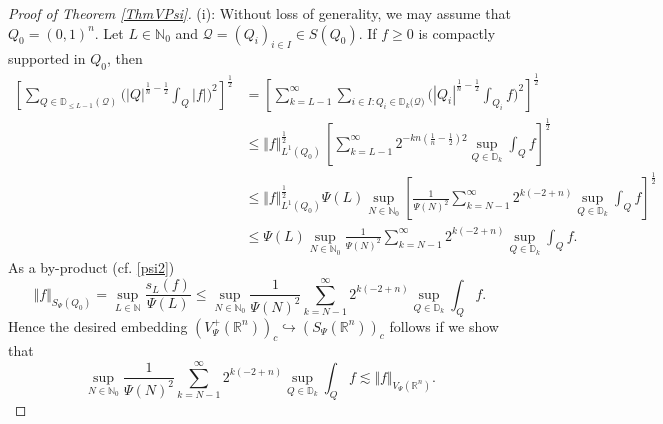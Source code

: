 \documentclass[11pt, a4paper,leqno]{amsart}
\theoremstyle{plain}
\numberwithin{equation}{section}
\theoremstyle{definition}
\theoremstyle{remark}
\def\R{\mathbb{R}}
\begin{document}
\begin{proof}
[Proof of Theorem \ref{ThmVPsi}]


(i): Without loss of generality, we may assume that
$Q_{0}=(0,1)^{n}$. Let $L\in\mathbb{N}_{0}$ and $\mathcal{Q} = (Q_i)_{i \in I}\in S(Q_{0})$. If $f \geq 0$ is compactly supported in $Q_0$, then
\begin{align*}
 \left[\sum_{Q \in \mathbb{D}_{\leq L-1} (\mathcal{Q})}\bigg(|Q|^{\frac{1}%
{n}-\frac{1}{2}}\int_{Q}|f|\bigg)^{2}\right]^{\frac{1}{2}} &  =\left[\sum_{k=L-1}^{\infty}\sum_{i\in I:Q_{i}%
\in\mathbb{D}_{k}(\mathcal{Q)}}\bigg(|Q_{i}|^{\frac{1}{n}-\frac{1}{2}}%
\int_{Q_{i}}f\bigg)^{2}\right]^{\frac{1}{2}}\\
&  \leq\Vert f\Vert_{L^{1}(Q_{0})}^{\frac{1}{2}}\,\left[\sum_{k=L-1}^{\infty
}2^{-kn(\frac{1}{n}-\frac{1}{2})2}\sup_{Q\in\mathbb{D}_{k}}\int_{Q}%
f\right]^{\frac{1}{2}}\\
&  \leq\Vert f\Vert_{L^{1}(Q_{0})}^{\frac{1}{2}}\Psi(L)\sup_{N\in
\mathbb{N}_{0}}\left[\frac{1}{\Psi(N)^{2}}\sum_{k=N-1}^{\infty}2^{k(-2+n)}%
\sup_{Q\in\mathbb{D}_{k}}\int_{Q}f\right]^{\frac{1}{2}}\\
&  \leq\Psi(L)\sup_{N\in\mathbb{N}_{0}}\frac{1}{\Psi(N)^{2}}\sum
_{k=N-1}^{\infty}2^{k(-2+n)}\sup_{Q\in\mathbb{D}_{k}}\int_{Q}f.
\end{align*}
As a by-product (cf. \eqref{psi2})
\begin{equation*}
\Vert f\Vert_{S_{\Psi}(Q_{0})}=\sup_{L\in\mathbb{N}}\frac{s_{L}(f)}{\Psi(L)}\leq\sup_{N\in\mathbb{N}_{0}%
}\frac{1}{\Psi(N)^{2}}\sum_{k=N-1}^{\infty}2^{k(-2+n)}\sup_{Q\in\mathbb{D}%
_{k}}\int_{Q}f.
\end{equation*}
Hence the desired embedding $(V^+_\Psi(\R^n))_c \hookrightarrow (S_\Psi(\R^n))_c$ follows if we show that
\begin{equation}
\sup_{N\in\mathbb{N}_{0}}\frac{1}{\Psi(N)^{2}}\sum_{k=N-1}^{\infty}%
2^{k(-2+n)}\sup_{Q\in\mathbb{D}_{k}}\int_{Q}f\lesssim\Vert f\Vert_{V_{\Psi
}(\mathbb{R}^{n})}.\label{5}%
\end{equation}



\end{proof}
\end{document}
